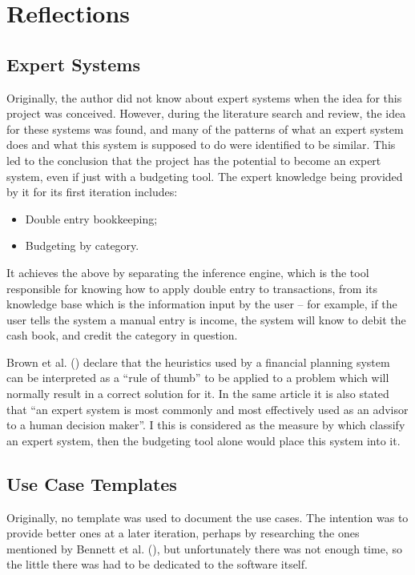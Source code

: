 \section{Reflections} \label{sec:Reflections}

\subsection{Expert Systems} \label{sec:Reflections.ExpertSystems}
Originally, the author did not know about expert systems when the idea for this
project was conceived. However, during the literature search and review, the
idea for these systems was found, and many of the patterns of what an expert
system does and what this system is supposed to do were identified to be
similar. This led to the conclusion that the project has the potential to
become an expert system, even if just with a budgeting tool. The expert
knowledge being provided by it for its first iteration includes:
\begin{itemize}
  \item
    Double entry bookkeeping;

  \item
    Budgeting by category.
\end{itemize}

It achieves the above by separating the inference engine, which is the tool
responsible for knowing how to apply double entry to transactions, from its
knowledge base which is the information input by the user -- for example, if
the user tells the system a manual entry is income, the system will know to
debit the cash book, and credit the category in question.

Brown et al. (\citeyear{brown1990expert}) declare that the heuristics used by a
financial planning system can be interpreted as a ``rule of thumb'' to be
applied to a problem which will normally result in a correct solution for it.
In the same article it is also stated that ``an expert system is most commonly
and most effectively used as an advisor to a human decision maker''. I this is
considered as the measure by which classify an expert system, then the
budgeting tool alone would place this system into it.

\subsection{Use Case Templates} \label{sec:Reflections.UseCaseTemplates}
Originally, no template was used to document the use cases. The intention was
to provide better ones at a later iteration, perhaps by researching the ones
mentioned by Bennett et al. (\citeyear[][p.~157]{bennett2010object}), but
unfortunately there was not enough time, so the little there was had to be
dedicated to the software itself.
